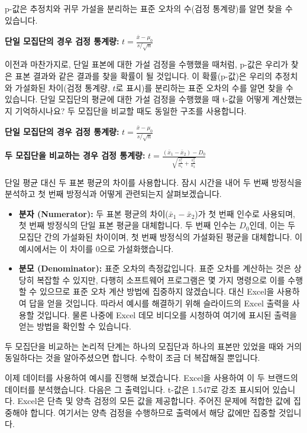 \documentclass[11pt,a4paper]{article}
\theoremstyle{definition}
\begin{document}
\begin{infobox}[title=두 브랜드 비교 (5/8): 3단계 - p-값 계산 (기본 원리)]
p-값은 추정치와 귀무 가설을 분리하는 표준 오차의 수(검정 통계량)를 알면 찾을 수 있습니다.

\textbf{단일 모집단의 경우 검정 통계량:}
$t = \frac{\bar{x} - \mu_0}{s/\sqrt{n}}$

이전과 마찬가지로, 단일 표본에 대한 가설 검정을 수행했을 때처럼, p-값은 우리가 찾은 표본 결과와 같은 결과를 찾을 확률이 될 것입니다. 이 확률(p-값)은 우리의 추정치와 가설화된 차이(검정 통계량, $t$로 표시)를 분리하는 표준 오차의 수를 알면 찾을 수 있습니다.
단일 모집단의 평균에 대한 가설 검정을 수행했을 때 t-값을 어떻게 계산했는지 기억하시나요? 두 모집단을 비교할 때도 동일한 구조를 사용합니다.
\end{infobox}

\begin{infobox}[title=두 브랜드 비교 (6/8): 3단계 - p-값 계산 (두 모집단)]
\textbf{단일 모집단의 경우 검정 통계량:}
$t = \frac{\bar{x} - \mu_0}{s/\sqrt{n}}$

\textbf{두 모집단을 비교하는 경우 검정 통계량:}
$t = \frac{(\bar{x}_1 - \bar{x}_2) - D_0}{\sqrt{\frac{s_1^2}{n_1} + \frac{s_2^2}{n_2}}}$

단일 평균 대신 두 표본 평균의 차이를 사용합니다. 잠시 시간을 내어 두 번째 방정식을 분석하고 첫 번째 방정식과 어떻게 관련되는지 살펴보겠습니다.
\begin{itemize}
    \item \textbf{분자 (Numerator):} 두 표본 평균의 차이($\bar{x}_1 - \bar{x}_2$)가 첫 번째 인수로 사용되며, 첫 번째 방정식의 단일 표본 평균을 대체합니다. 두 번째 인수는 $D_0$인데, 이는 두 모집단 간의 가설화된 차이이며, 첫 번째 방정식의 가설화된 평균을 대체합니다. 이 예시에서는 이 차이를 0으로 가설화했습니다.
    \item \textbf{분모 (Denominator):} 표준 오차의 측정값입니다. 표준 오차를 계산하는 것은 상당히 복잡할 수 있지만, 다행히 소프트웨어 프로그램은 몇 가지 명령으로 이를 수행할 수 있으므로 표준 오차 계산 방법에 집중하지 않겠습니다. 대신 Excel을 사용하여 답을 얻을 것입니다. 따라서 예시를 해결하기 위해 슬라이드의 Excel 출력을 사용할 것입니다. 물론 나중에 Excel 데모 비디오를 시청하여 여기에 표시된 출력을 얻는 방법을 확인할 수 있습니다.
\end{itemize}
두 모집단을 비교하는 논리적 단계는 하나의 모집단과 하나의 표본만 있었을 때와 거의 동일하다는 것을 알아주셨으면 합니다. 수학이 조금 더 복잡해질 뿐입니다.

이제 데이터를 사용하여 예시를 진행해 보겠습니다. Excel을 사용하여 이 두 브랜드의 데이터를 분석했습니다. 다음은 그 출력입니다. t-값은 1.547로 강조 표시되어 있습니다. Excel은 단측 및 양측 검정의 모든 값을 제공합니다. 주어진 문제에 적합한 값에 집중해야 합니다. 여기서는 양측 검정을 수행하므로 출력에서 해당 값에만 집중할 것입니다.


\end{infobox}
\end{document}
